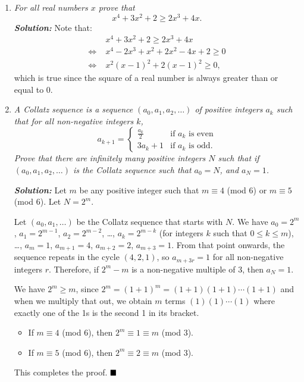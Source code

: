 \documentclass[12pt]{article}
\newcommand{\sol}{\textbf{\textit{Solution: }}}
\begin{document}
\begin{enumerate}[topsep=2\bigskipamount,itemsep=\bigskipamount]
\item \textit{For all real numbers $x$ prove that
$$x^4 + 3x^2 + 2 \geqslant 2x^3 + 4x.$$}
\sol Note that:
\begin{align*}
           &x^4 + 3x^2 + 2                    \geqslant 2x^3 + 4x     \\
    \iff\; &x^4 - 2x^3 + x^2 + 2x^2 - 4x + 2  \geqslant 0             \\
    \iff\; &x^2(x - 1)^2 + 2(x-1)^2           \geqslant 0,
\end{align*}
which is true since the square of a real number is always greater than or equal to 0.
\item \textit{A \emph{Collatz sequence} is a sequence \((a_{0}, a_{1}, a_{2}, \ldots)\) of positive integers \(a_{k}\) such that for all non-negative integers \(k\),
\[a_{k + 1} = \begin{cases}
\frac{a_{k}}{2} & \textrm{if \(a_{k}\) is even}\\
3a_{k} + 1 & \textrm{if \(a_{k}\) is odd.}
\end{cases}\]
Prove that there are infinitely many positive integers \(N\) such that if \((a_{0}, a_{1}, a_{2}, \ldots)\) is the Collatz sequence such that \(a_{0} = N\), and     \(a_{N} = 1\).}

\sol
Let \(m\) be any positive integer such that \(m \equiv 4\) (mod 6) or \(m \equiv 5\) (mod 6). Let \(N = 2^{m}\).

Let \((a_{0}, a_{1}, \ldots)\) be the Collatz sequence that starts with \(N\). We have \(a_{0} = 2^{m}\), \(a_{1} = 2^{m - 1}\), \(a_{2} = 2^{m - 2}\), \ldots, \(a_{k} = 2^{m - k}\) (for integers \(k\) such that \(0 \leqslant k \leqslant m\)), \ldots, \(a_{m} = 1\), \(a_{m + 1} = 4\), \(a_{m + 2} = 2\), \(a_{m + 3} = 1\). From that point onwards, the sequence repeats in the cycle \((4, 2, 1)\), so \(a_{m + 3r} = 1\) for all non-negative integers \(r\). Therefore, if \(2^{m} - m\) is a non-negative multiple of 3, then \(a_{N} = 1\).

We have \(2^{m} \geqslant m\), since \(2^{m} = (1 + 1)^{m} = (1 + 1)(1 + 1)\cdots{}(1 + 1)\) and when we multiply that out, we obtain \(m\) terms \((1)(1)\cdots(1)\) where exactly one of the 1s is the second 1 in its bracket.
\begin{itemize}
\item If \(m \equiv 4\) (mod 6), then \(2^{m} \equiv 1 \equiv m\) (mod 3).
\item If \(m \equiv 5\) (mod 6), then \(2^{m} \equiv 2 \equiv m\) (mod 3).
\end{itemize}
This completes the proof. $\hfill\blacksquare$


\end{enumerate}
\end{document}
